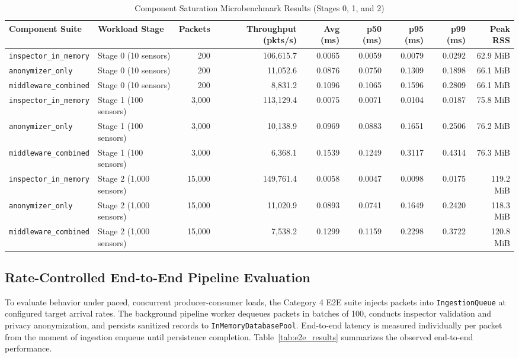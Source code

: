 \begin{table}[H]
\centering
\caption{Component Saturation Microbenchmark Results (Stages 0, 1, and 2)}
\label{tab:saturation_microbenchmarks}
\scriptsize
\begin{tabularx}{\linewidth}{@{}l l r r r r r r r@{}}
\toprule
\textbf{Component Suite} & \textbf{Workload Stage} & \textbf{Packets} & \textbf{Throughput (pkts/s)} & \textbf{Avg (ms)} & \textbf{p50 (ms)} & \textbf{p95 (ms)} & \textbf{p99 (ms)} & \textbf{Peak RSS} \\
\midrule
\texttt{inspector\_in\_memory} & Stage 0 (10 sensors) & 200 & 106,615.7 & 0.0065 & 0.0059 & 0.0079 & 0.0292 & 62.9 MiB \\
\texttt{anonymizer\_only} & Stage 0 (10 sensors) & 200 & 11,052.6 & 0.0876 & 0.0750 & 0.1309 & 0.1898 & 66.1 MiB \\
\texttt{middleware\_combined} & Stage 0 (10 sensors) & 200 & 8,831.2 & 0.1096 & 0.1065 & 0.1596 & 0.2809 & 66.1 MiB \\
\midrule
\texttt{inspector\_in\_memory} & Stage 1 (100 sensors) & 3,000 & 113,129.4 & 0.0075 & 0.0071 & 0.0104 & 0.0187 & 75.8 MiB \\
\texttt{anonymizer\_only} & Stage 1 (100 sensors) & 3,000 & 10,138.9 & 0.0969 & 0.0883 & 0.1651 & 0.2506 & 76.2 MiB \\
\texttt{middleware\_combined} & Stage 1 (100 sensors) & 3,000 & 6,368.1 & 0.1539 & 0.1249 & 0.3117 & 0.4314 & 76.3 MiB \\
\midrule
\texttt{inspector\_in\_memory} & Stage 2 (1,000 sensors) & 15,000 & 149,761.4 & 0.0058 & 0.0047 & 0.0098 & 0.0175 & 119.2 MiB \\
\texttt{anonymizer\_only} & Stage 2 (1,000 sensors) & 15,000 & 11,020.9 & 0.0893 & 0.0741 & 0.1649 & 0.2420 & 118.3 MiB \\
\texttt{middleware\_combined} & Stage 2 (1,000 sensors) & 15,000 & 7,538.2 & 0.1299 & 0.1159 & 0.2298 & 0.3722 & 120.8 MiB \\
\bottomrule
\end{tabularx}
\end{table}

\subsection{Rate-Controlled End-to-End Pipeline Evaluation}
To evaluate behavior under paced, concurrent producer-consumer loads, the Category 4 E2E suite injects packets into \texttt{IngestionQueue} at configured target arrival rates. The background pipeline worker dequeues packets in batches of 100, conducts inspector validation and privacy anonymization, and persists sanitized records to \texttt{InMemoryDatabasePool}. End-to-end latency is measured individually per packet from the moment of ingestion enqueue until persistence completion. Table~\ref{tab:e2e_results} summarizes the observed end-to-end performance.

